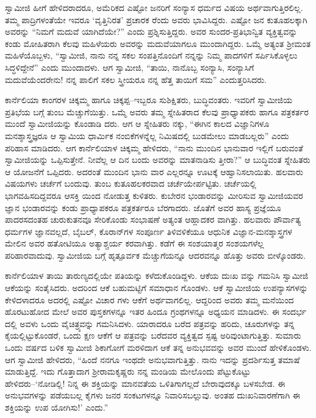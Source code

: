 ಸ್ವಾಮೀಜಿ ಹೀಗೆ ಹೇಳಿದರಾದರೂ, ಅಮೆರಿಕದ ಎಷ್ಟೋ ಜನರಿಗೆ ಸಂನ್ಯಾಸ ಧರ್ಮದ ವಿಷಯ ಅರ್ಥವಾಗುತ್ತಿರಲಿಲ್ಲ. ತಮ್ಮ ಪಾದ್ರಿಗಳಂತೆಯೇ ಇವರೂ ‘ವೃತ್ತಿನಿರತ’ ಪ್ರಚಾರಕ ರೆಂದು ಅವರು ಭಾವಿಸಿದ್ದರು. ಎಷ್ಟೋ ಜನ ಕುತೂಹಲಕ್ಕಾಗಿ ಅವರನ್ನು “ನಿಮಗೆ ಮದುವೆ ಯಾಗಿದೆಯೇ?” ಎಂದು ಪ್ರಶ್ನಿಸುತ್ತಿದ್ದರು. ಅವರ ಸುಂದರ-ಪ್ರತಿಭಾನ್ವಿತ ವ್ಯಕ್ತಿತ್ವವನ್ನು ಕಂಡು ಮೋಹಿತರಾಗಿ ಕೆಲವು ಮಹಿಳೆಯರು ಅವರನ್ನು ಮದುವೆಯಾಗಲೂ ಮುಂದಾಗಿದ್ದರು. ಒಮ್ಮೆ ಅತ್ಯಂತ ಶ್ರೀಮಂತ ಮಹಿಳೆಯೊಬ್ಬಳು, “ಸ್ವಾಮೀಜಿ, ನಾನು ನನ್ನ ಸಕಲ ಸಂಪತ್ತಿನೊಂದಿಗೆ ನನ್ನನ್ನು ನಿಮ್ಮ ಪಾದಗಳಿಗೆ ಸರ್ಪಿಸಿಕೊಳ್ಳಲು ಸಿದ್ಧಳಿದ್ದೇನೆ” ಎಂದು ಮುಂದಾದಳು. ಆಗ ಸ್ವಾಮೀಜಿ, “ತಾಯಿ, ನಾನೊಬ್ಬ ಸಂನ್ಯಾಸಿ, ಸಂನ್ಯಾಸಿಗೆ ಮದುವೆಯೆಂದರೇನು! ನನ್ನ ಪಾಲಿಗೆ ಸಕಲ ಸ್ತ್ರೀಯರೂ ನನ್ನ ಹೆತ್ತ ತಾಯಿಗೆ ಸಮ” ಎಂದುತ್ತರಿಸಿದರು.

ಕಾರ್ನೆಲಿಯಾ ಕಾಂಗರಳ ಚಿಕ್ಕಮ್ಮ ಹಾಗೂ ಚಿಕ್ಕಪ್ಪ–ಇಬ್ಬರೂ ಸುಶಿಕ್ಷಿತರು, ಬುದ್ಧಿವಂತರು. ಇವರಿಗೆ ಸ್ವಾಮೀಜಿಯ ಪ್ರತಿಭೆಯ ಬಗ್ಗೆ ತುಂಬ ಮೆಚ್ಚುಗೆಯಿತ್ತು. ಒಮ್ಮೆ ಅವರು ತಮ್ಮ ಸ್ನೇಹಿತರಾದ ಕೆಲವು ಪ್ರಾಧ್ಯಾಪಕರು ಹಾಗೂ ಪತ್ರಕರ್ತರ ಮುಂದೆ ಸ್ವಾಮೀಜಿಯನ್ನು ಕೊಂಡಾಡಿ ದರು. ಆಗ ಆ ಸ್ನೇಹಿತರು ನಕ್ಕು, “ಈಗಿನ ಕಾಲದ ವಿಜ್ಞಾನಿಗಳೂ ಮನಶ್ಶಾಸ್ತ್ರಜ್ಞರೂ ಆ ಸ್ವಾಮಿಯ ಧಾರ್ಮಿಕ ನಂಬಿಕೆಗಳನ್ನೆಲ್ಲ ನಿಮಿಷದಲ್ಲಿ ಬುಡಮೇಲು ಮಾಡಬಲ್ಲರು” ಎಂದು ಪರಿಹಾಸ ಮಾಡಿದರು. ಆಗ ಕಾರ್ನೆಲಿಯಾಳ ಚಿಕ್ಕಮ್ಮ ಹೇಳಿದರು, “ನಾನು ಮುಂದಿನ ಭಾನುವಾರ ಇಲ್ಲಿಗೆ ಬರುವಂತೆ ಸ್ವಾಮೀಜಿಯನ್ನು ಒಪ್ಪಿಸುತ್ತೇನೆ. ನೀವೆಲ್ಲ ಆ ದಿನ ಬಂದು ಅವರನ್ನು ಮಾತನಾಡಿಸು ತ್ತೀರಾ?” ಆ ಬುದ್ಧಿವಂತ ಸ್ನೇಹಿತರು ಆ ಯೋಜನೆಗೆ ಒಪ್ಪಿದರು. ಅದರಂತೆ ಮುಂದಿನ ಭಾನು ವಾರ ಎಲ್ಲರನ್ನೂ ಊಟಕ್ಕೆ ಆಹ್ವಾನಿಸಲಾಯಿತು. ಹಲವಾರು ವಿಷಯಗಳು ಚರ್ಚೆಗೆ ಬಂದುವು. ತುಂಬ ಕುತೂಹಲಕರವಾದ ಚರ್ಚೆಯೇರ್ಪಟ್ಟಿತು. ಚರ್ಚೆಯಲ್ಲಿ ಭಾಗವಹಿಸದಿದ್ದವರೂ ಆಸಕ್ತಿ ಯಿಂದ ನೋಡುತ್ತ ಕುಳಿತರು. ಕುಬೇರನ ಭಂಡಾರವನ್ನು ಮೀರಿಸುವ ಸ್ವಾಮೀಜಿಯವರ ಜ್ಞಾನ ಭಂಡಾರವನ್ನು ಕಂಡು ಪ್ರಾಧ್ಯಾಪಕರೂ ಪತ್ರಕರ್ತರೂ ಬೆರಗಾದರು. ಜೊತೆಗೆ ಅವರ ಹಾಸ್ಯ ಪ್ರಜ್ಞೆಯೂ ಪಾದರಸದಂತಹ ಚುರುಕುತನವೂ ಸೇರಿಕೊಂಡು ಸಂಭಾಷಣೆ ಅತ್ಯಂತ ಆಹ್ಲಾದಕರ ವಾಗಿತ್ತು. ಹಲವಾರು ಪೌರ್ವಾತ್ಯ ಧರ್ಮಗಳ ಜ್ಞಾನವಲ್ಲದೆ, ಬೈಬಲ್, ಕೊರಾನ್​ಗಳ ಸಂಪೂರ್ಣ ತಿಳಿವಳಿಕೆಯೂ ಆಧುನಿಕ ವಿಜ್ಞಾನ-ಮನಶ್ಶಾಸ್ತ್ರಗಳ ಮೇಲಿನ ಅವರ ಹತೋಟಿಯೂ ಅತ್ಯಾಶ್ಚರ್ಯ ಕರವಾಗಿತ್ತು. ಕಡೆಗೆ ಈ ಸಂಶಯಾತ್ಮರ ಸಂಶಯಗಳೆಲ್ಲ ಪರಿಹಾರವಾದುವು. ಸ್ವಾಮೀಜಿಯ ಬಗ್ಗೆ ಹೃತ್ಪೂರ್ವಕ ಮೆಚ್ಚುಗೆಯನ್ನೂ ಆದರವನ್ನೂ ಹೊತ್ತು ಅವರು ಬೀಳ್ಕೊಂಡರು.

ಕಾರ್ನೆಲಿಯಾಳ ತಾಯಿ ತಾರುಣ್ಯದಲ್ಲಿಯೇ ಪತಿಯನ್ನು ಕಳೆದುಕೊಂಡಿದ್ದಳು. ಆಕೆಯ ದುಃಖ ವನ್ನು ಗಮನಿಸಿ ಸ್ವಾಮೀಜಿ ಆಕೆಯನ್ನು ಸಂತೈಸಿದರು. ಅದರಿಂದ ಆಕೆ ಬಹುಮಟ್ಟಿಗೆ ಸಮಾಧಾನ ಗೊಂಡಳು. ಆಕೆ ಸ್ವಾಮೀಜಿಯ ಉಪನ್ಯಾಸಗಳನ್ನು ಕೇಳಿದಳಾದರೂ ಅದರಲ್ಲಿ ಎಷ್ಟೋ ವಿಚಾರ ಗಳು ಆಕೆಗೆ ಅರ್ಥವಾಗಲಿಲ್ಲ. ಆದ್ದರಿಂದ ಅವರು ತಮ್ಮ ಮನೆಯಿಂದ ಹೊರಟುಹೋದ ಮೇಲೆ ಅವರ ಪುಸ್ತಕಗಳನ್ನೂ ಇತರ ಹಿಂದೂ ಗ್ರಂಥಗಳನ್ನೂ ಅಧ್ಯಯನ ಮಾಡಿದಳು. ಈ ಸಂದರ್ಭ ದಲ್ಲಿ ಅವಳು ಒಂದು ವೈಚಿತ್ರ್ಯವನ್ನು ಗಮನಿಸಿದಳು. ಯಾರಾದರೂ ಬರೆದ ಪತ್ರವನ್ನು ಹರಿದು, ಚೂರುಗಳನ್ನು ತನ್ನ ಕೈಯಲ್ಲಿಟ್ಟುಕೊಂಡರೆ, ಒಂದು ಕ್ಷಣ ಆಕೆಗೆ ಆ ಪತ್ರವನ್ನು ಬರೆದವರ ವ್ಯಕ್ತಿತ್ವದ ಸ್ಪಷ್ಟ ಅರಿವುಂಟಾಗುತ್ತಿತ್ತು. ಸುಮಾರು ಒಂದು ವರ್ಷದ ಬಳಿಕ ಸ್ವಾಮೀಜಿ ಶಿಕಾಗೋಗೆ ಮರಳಿದಾಗ ಆಕೆ ತನ್ನ ಅನುಭವವನ್ನು ಅವರ ಮುಂದೆ ಹೇಳಿಕೊಂಡಳು. ಆಗ ಸ್ವಾಮೀಜಿ ಹೇಳಿದರು, “ಹಿಂದೆ ನನಗೂ ಇಂಥದೇ ಅನುಭವಾಗುತ್ತಿತ್ತು. ನಾನು ಇದನ್ನು ಪ್ರದರ್ಶಿಸುತ್ತ ತಮಾಷೆ ಮಾಡುತ್ತಿದ್ದೆ. ಇದು ಗೊತ್ತಾದಾಗ ಶ್ರೀರಾಮಕೃಷ್ಣರು ನನ್ನ ಮಂಡಿಯ ಮೇಲೊಂದು ಪೆಟ್ಟುಕೊಟ್ಟು ಹೇಳಿದರು–‘ನೋಡಿಲ್ಲಿ! ನಿನ್ನ ಈ ಶಕ್ತಿಯನ್ನು ಮಾನವತೆಯ ಒಳಿತಿಗಾಗಲ್ಲದೆ ಬೇರಾವುದಕ್ಕೂ ಬಳಸಬೇಡ. ಈ ಅನುಭವಗಳನ್ನು ಪಡೆಯಬಲ್ಲ ಕೈಗಳು ಜನರ ಸಂಕಟಗಳನ್ನೂ ನಿವಾರಿಸಬಲ್ಲುವು. ಅಂತಹ ದುಃಖನಿವಾರಣೆಗಾಗಿ ಈ ಶಕ್ತಿಯನ್ನು ಉಪ ಯೋಗಿಸು!’ ಎಂದು.”

